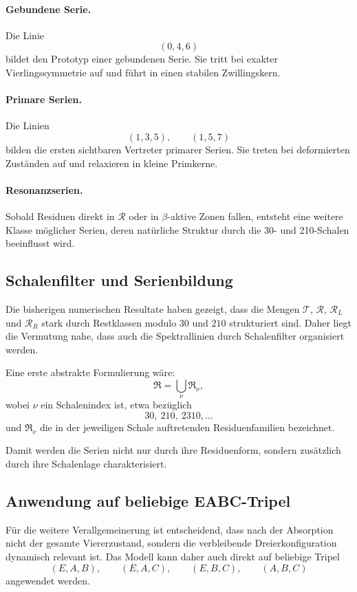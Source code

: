 \documentclass[11pt,a4paper]{article}
\theoremstyle{definition}
\theoremstyle{plain}
\theoremstyle{remark}
\begin{document}
	\paragraph{Gebundene Serie.}
	Die Linie
	\[
	(0,4,6)
	\]
	bildet den Prototyp einer gebundenen Serie. 
	Sie tritt bei exakter Vierlingssymmetrie auf und führt in einen stabilen Zwillingskern.
	
	\paragraph{Primare Serien.}
	Die Linien
	\[
	(1,3,5),\qquad (1,5,7)
	\]
	bilden die ersten sichtbaren Vertreter primarer Serien. 
	Sie treten bei deformierten Zuständen auf und relaxieren in kleine Primkerne.
	
	\paragraph{Resonanzserien.}
	Sobald Residuen direkt in \(\mathcal R\) oder in \(\beta\)-aktive Zonen fallen, entsteht eine weitere Klasse möglicher Serien, deren natürliche Struktur durch die 30- und 210-Schalen beeinflusst wird.
	
	\subsection{Schalenfilter und Serienbildung}
	
	Die bisherigen numerischen Resultate haben gezeigt, dass die Mengen \(\mathcal T\), \(\mathcal R\), \(\mathcal R_L\) und \(\mathcal R_R\) stark durch Restklassen modulo \(30\) und \(210\) strukturiert sind. 
	Daher liegt die Vermutung nahe, dass auch die Spektrallinien durch Schalenfilter organisiert werden.
	
	Eine erste abstrakte Formulierung wäre:
	\[
	\mathfrak R
	=
	\bigcup_{\nu} \mathfrak R_\nu,
	\]
	wobei \(\nu\) ein Schalenindex ist, etwa bezüglich
	\[
	30,\ 210,\ 2310,\dots
	\]
	und \(\mathfrak R_\nu\) die in der jeweiligen Schale auftretenden Residuenfamilien bezeichnet.
	
	Damit werden die Serien nicht nur durch ihre Residuenform, sondern zusätzlich durch ihre Schalenlage charakterisiert.
	
	\subsection{Anwendung auf beliebige EABC-Tripel}
	
	Für die weitere Verallgemeinerung ist entscheidend, dass nach der Absorption nicht der gesamte Viererzustand, sondern die verbleibende Dreierkonfiguration dynamisch relevant ist. 
	Das Modell kann daher auch direkt auf beliebige Tripel
	\[
	(E,A,B),\qquad (E,A,C),\qquad (E,B,C),\qquad (A,B,C)
	\]
	angewendet werden.
	
\end{document}
